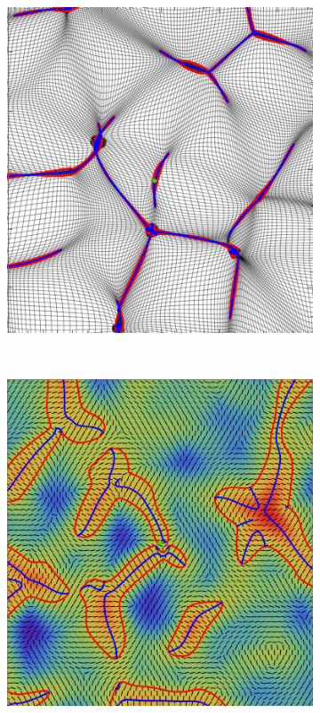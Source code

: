 \documentclass[a4paper, 11pt]{article}
\begin{document}
\begin{figure}
\begin{subfigure}[b]{0.28\textwidth}
\end{subfigure}~
\begin{subfigure}[b]{0.28\textwidth}
\includegraphics[width=\textwidth]{Cusp_Nb}
\end{subfigure}\\ \vspace{0.2\baselineskip}
\begin{subfigure}[b]{0.28\textwidth}
\includegraphics[width=\textwidth]{Swallowtail_L}

\end{subfigure}
\end{figure}
\end{document}
